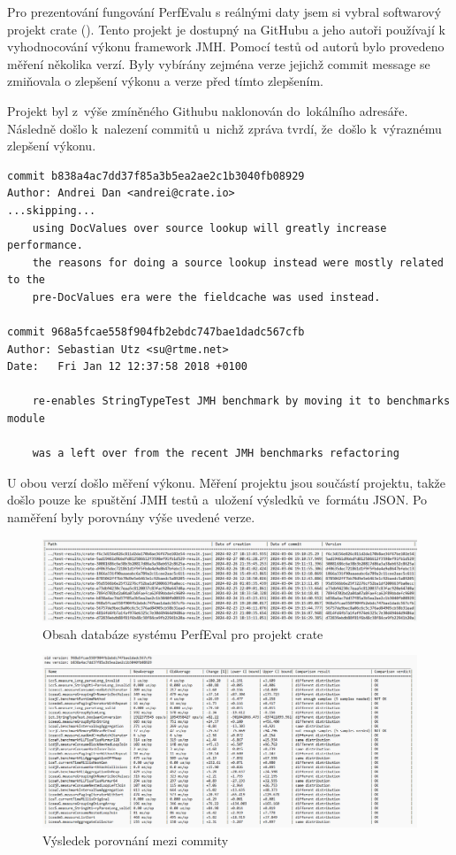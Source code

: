 Pro prezentování fungování PerfEvalu s reálnými daty jsem si vybral softwarový projekt crate  (\cite{crateDB}).
Tento projekt je dostupný na GitHubu a jeho autoři používají k vyhodnocování výkonu framework JMH.
Pomocí testů od autorů bylo provedeno měření několika verzí. Byly vybírány zejména verze jejichž
commit message se zmiňovala o zlepšení výkonu a verze před tímto zlepšením.

Projekt byl z~výše zmíněného Githubu naklonován do~lokálního adresáře. Následně došlo
k~nalezení commitů u~nichž zpráva tvrdí, že~došlo k~výraznému zlepšení výkonu.

\begin{lstlisting}
commit b838a4ac7dd37f85a3b5ea2ae2c1b3040fb08929
Author: Andrei Dan <andrei@crate.io>
...skipping...
    using DocValues over source lookup will greatly increase performance.
    the reasons for doing a source lookup instead were mostly related to the
    pre-DocValues era were the fieldcache was used instead.

commit 968a5fcae558f904fb2ebdc747bae1dadc567cfb
Author: Sebastian Utz <su@rtme.net>
Date:   Fri Jan 12 12:37:58 2018 +0100

    re-enables StringTypeTest JMH benchmark by moving it to benchmarks module

    was a left over from the recent JMH benchmarks refactoring

\end{lstlisting}

U obou verzí došlo měření výkonu. Měření projektu jsou součástí projektu, takže došlo
pouze ke~spuštění JMH testů a~uložení výsledků ve~formátu JSON. Po naměření byly porovnány
výše uvedené verze.

\begin{figure}[!ht]
    \centering
    \includegraphics[width=1\textwidth]{../img/list-results-crate.png}
    \caption{Obsah databáze systému PerfEval pro projekt crate}
\end{figure}

\begin{figure}[!ht]
    \centering
    \includegraphics[width=1\textwidth]{../img/version-comparison-nes.png}
    \caption{Výsledek porovnání mezi commity}
\end{figure}

